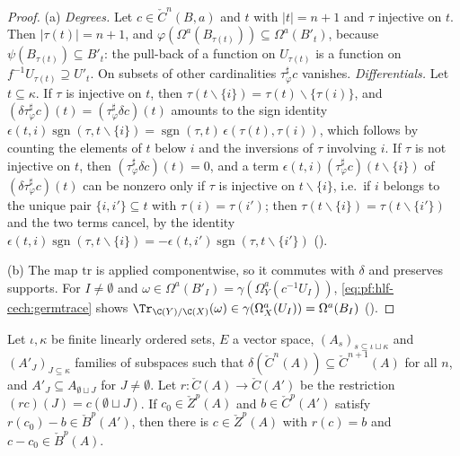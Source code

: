 \begin{proof}
(a) \emph{Degrees.} Let $c\in\check C^n(B,a)$ and $t$ with $|t|=n+1$ and $\tau$ injective on $t$. Then $|\tau(t)|=n+1$, and
$\varphi(\Omega^a(B_{\tau(t)}))\subseteq\Omega^a(B'_t)$, because $\psi(B_{\tau(t)})\subseteq B'_t$: the pull-back of a function on $U_{\tau(t)}$ is a
function on $f^{-1}U_{\tau(t)}\supseteq U'_t$. On subsets of other cardinalities $\tau^\sharp_\varphi c$ vanishes. \emph{Differentials.} Let $t\subseteq\kappa$.
If $\tau$ is injective on $t$, then $\tau(t\smallsetminus\{i\})=\tau(t)\smallsetminus\{\tau(i)\}$, and $(\delta\tau^\sharp_\varphi c)(t)=(\tau^\sharp_\varphi\delta c)(t)$
amounts to the sign identity $\epsilon(t,i)\operatorname{sgn}(\tau,t\smallsetminus\{i\})=\operatorname{sgn}(\tau,t)\,\epsilon(\tau(t),\tau(i))$, which follows by
counting the elements of $t$ below $i$ and the inversions of $\tau$ involving $i$. If $\tau$ is not injective on $t$, then
$(\tau^\sharp_\varphi\delta c)(t)=0$, and a term $\epsilon(t,i)(\tau^\sharp_\varphi c)(t\smallsetminus\{i\})$ of $(\delta\tau^\sharp_\varphi c)(t)$ can be nonzero only if
$\tau$ is injective on $t\smallsetminus\{i\}$, i.e.\ if $i$ belongs to the unique pair $\{i,i'\}\subseteq t$ with $\tau(i)=\tau(i')$; then
$\tau(t\smallsetminus\{i\})=\tau(t\smallsetminus\{i'\})$ and the two terms cancel, by the identity
$\epsilon(t,i)\operatorname{sgn}(\tau,t\smallsetminus\{i\})=-\epsilon(t,i')\operatorname{sgn}(\tau,t\smallsetminus\{i'\})$
().

(b) The map $\mathrm{tr}$ is applied componentwise, so it commutes with $\delta$ and preserves supports. For $I\ne\emptyset$ and
$\omega\in\Omega^a(B'_I)=\gamma(\Omega^a_Y(c^{-1}U_I))$, \eqref{eq:pf:hlf-cech:germtrace} shows $\Tr_{\C(Y)/\C(X)}(\omega)\in\gamma(\Omega^a_X(U_I))=\Omega^a(B_I)$
().
\end{proof}

\begin{lemma}\label{pf:hlf-cech:liftcoc}
Let $\iota,\kappa$ be finite linearly ordered sets, $E$ a vector space, $(A_s)_{s\subseteq\iota\sqcup\kappa}$ and $(A'_J)_{J\subseteq\kappa}$ families of
subspaces such that $\delta(\check C^n(A))\subseteq\check C^{n+1}(A)$ for all $n$, and $A'_J\subseteq A_{\emptyset\sqcup J}$ for
$J\ne\emptyset$. Let $r\colon\check C(A)\to\check C(A')$ be the restriction $(rc)(J)=c(\emptyset\sqcup J)$. If $c_0\in\check Z^p(A)$ and $b\in\check C^p(A')$
satisfy $r(c_0)-b\in\check B^p(A')$, then there is $c\in\check Z^p(A)$ with $r(c)=b$ and $c-c_0\in\check B^p(A)$.
\end{lemma}

